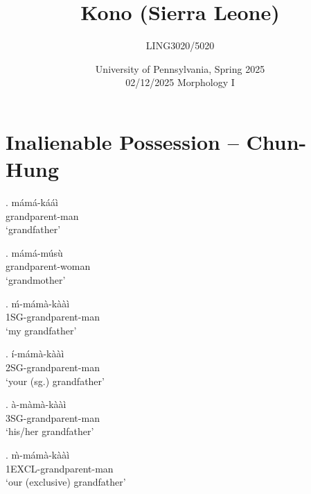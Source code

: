 \documentclass{assets/fieldnotes}
\title{Kono (Sierra Leone)}
\author{LING3020/5020}
\date{University of Pennsylvania, Spring 2025\\02/12/2025 Morphology I}
\begin{document}
\maketitle
\tableofcontents


\section{Inalienable Possession -- Chun-Hung} 




\exg. m\'{a}m\'{a}-k\'{a}\'{a}\`{i} \\
grandparent-man \\
`grandfather'

\exg. m\'{a}m\'{a}-m\'{u}s\`{u} \\
grandparent-woman \\
`grandmother'

\exg. \'{m}-m\'{a}m\`{a}-k\`{a}\`{a}\`{i} \\
1SG-grandparent-man \\
`my grandfather'

\exg. \'{i}-m\'{a}m\`{a}-k\`{a}\`{a}\`{i} \\
2SG-grandparent-man \\
`your (sg.) grandfather'

\exg. \`{a}-m\`{a}m\`{a}-k\`{a}\`{a}\`{i} \\
3SG-grandparent-man \\
`his/her grandfather'

\exg. \`{m}-m\'{a}m\`{a}-k\`{a}\`{a}\`{i} \\
1EXCL-grandparent-man \\
`our (exclusive) grandfather' 
\end{document}

